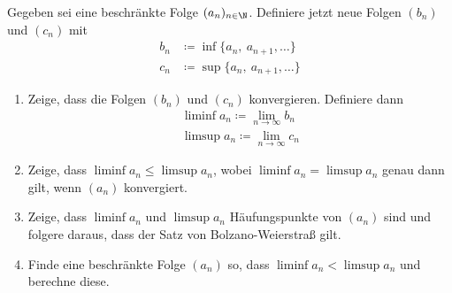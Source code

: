 \begin{prob}
  Gegeben sei eine beschränkte Folge $(a_n)_{n \in \N}$. Definiere jetzt neue
  Folgen $(b_n)$ und $(c_n)$ mit
  \begin{equation*}
    \begin{split}
      b_n &\coloneqq \inf \{a_n,\ a_{n+1}, \ldots\}\\
      c_n &\coloneqq \sup \{a_n,\ a_{n+1}, \ldots\}
    \end{split}
  \end{equation*}
  \begin{enumerate}[label=(\alph*)]
  \item Zeige, dass die Folgen $(b_n)$ und $(c_n)$ konvergieren. Definiere dann
    \begin{equation*}
      \begin{split}
        \liminf a_n \coloneqq \lim_{n \to \infty}b_n\\
        \limsup a_n \coloneqq \lim_{n \to \infty}c_n
      \end{split}
    \end{equation*}
  \item Zeige, dass $\liminf a_n \leq \limsup a_n$, wobei
    $\liminf a_n = \limsup a_n$ genau dann gilt, wenn $(a_n)$ konvergiert.
  \item Zeige, dass $\liminf a_n$ und $\limsup a_n$ Häufungspunkte von $(a_n)$
    sind und folgere daraus, dass der Satz von Bolzano-Weierstraß gilt.
  \item Finde eine beschränkte Folge $(a_n)$ so, dass $\liminf a_n < \limsup a_n$
    und berechne diese.
  \end{enumerate}
\end{prob}
